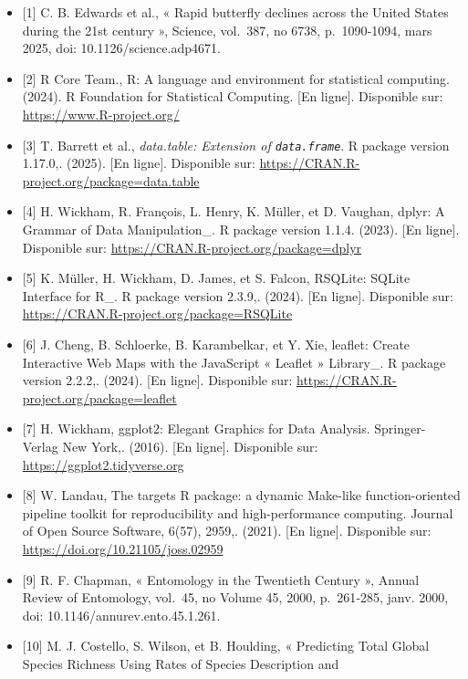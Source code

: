 \documentclass[preprint, 3p,
authoryear]{elsarticle} %
\begin{document}
\begin{itemize}
\item
  {[}1{]} C. B. Edwards et al., « Rapid butterfly declines across the
  United States during the 21st century », Science, vol.~387, no 6738,
  p.~1090‑1094, mars 2025, doi: 10.1126/science.adp4671.
\item
  {[}2{]} R Core Team., R: A language and environment for statistical
  computing. (2024). R Foundation for Statistical Computing. {[}En
  ligne{]}. Disponible sur: \url{https://www.R-project.org/}
\item
  {[}3{]} T. Barrett et al., \emph{data.table: Extension of
  \texttt{data.frame}}. R package version 1.17.0,. (2025). {[}En
  ligne{]}. Disponible sur:
  \url{https://CRAN.R-project.org/package=data.table}
\item
  {[}4{]} H. Wickham, R. François, L. Henry, K. Müller, et D. Vaughan,
  dplyr: A Grammar of Data Manipulation\_. R package version 1.1.4.
  (2023). {[}En ligne{]}. Disponible sur:
  \url{https://CRAN.R-project.org/package=dplyr}
\item
  {[}5{]} K. Müller, H. Wickham, D. James, et S. Falcon, RSQLite: SQLite
  Interface for R\_. R package version 2.3.9,. (2024). {[}En ligne{]}.
  Disponible sur: \url{https://CRAN.R-project.org/package=RSQLite}
\item
  {[}6{]} J. Cheng, B. Schloerke, B. Karambelkar, et Y. Xie, leaflet:
  Create Interactive Web Maps with the JavaScript « Leaflet » Library\_.
  R package version 2.2.2,. (2024). {[}En ligne{]}. Disponible sur:
  \url{https://CRAN.R-project.org/package=leaflet}
\item
  {[}7{]} H. Wickham, ggplot2: Elegant Graphics for Data Analysis.
  Springer-Verlag New York,. (2016). {[}En ligne{]}. Disponible sur:
  \url{https://ggplot2.tidyverse.org}
\item
  {[}8{]} W. Landau, The targets R package: a dynamic Make-like
  function-oriented pipeline toolkit for reproducibility and
  high-performance computing. Journal of Open Source Software, 6(57),
  2959,. (2021). {[}En ligne{]}. Disponible sur:
  \url{https://doi.org/10.21105/joss.02959}
\item
  {[}9{]} R. F. Chapman, « Entomology in the Twentieth Century », Annual
  Review of Entomology, vol.~45, no Volume 45, 2000, p.~261‑285, janv.
  2000, doi: 10.1146/annurev.ento.45.1.261.
\item
  {[}10{]} M. J. Costello, S. Wilson, et B. Houlding, « Predicting Total
  Global Species Richness Using Rates of Species Description and

\end{itemize}
\end{document}
